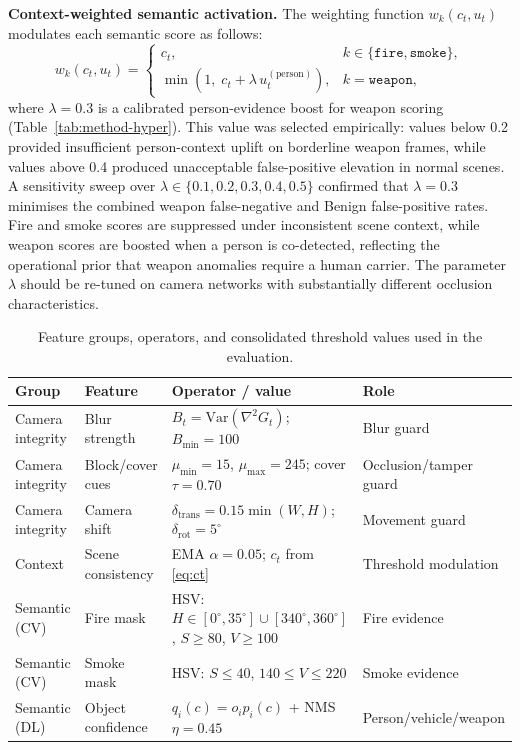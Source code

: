 \documentclass[sensors,article,submit,pdftex,moreauthors]{Definitions/mdpi}
\begin{document}
\textbf{Context-weighted semantic activation.} The weighting function $w_k(c_t, u_t)$ modulates each semantic score as follows:
\begin{equation}
\label{eq:wk}
w_k(c_t, u_t) =
\begin{cases}
c_t, & k \in \{\texttt{fire}, \texttt{smoke}\}, \\
\min(1,\; c_t + \lambda\, u_t^{(\text{person})}), & k = \texttt{weapon},
\end{cases}
\end{equation}
where $\lambda = 0.3$ is a calibrated person-evidence boost for weapon scoring (Table~\ref{tab:method-hyper}). This value was selected empirically: values below 0.2 provided insufficient person-context uplift on borderline weapon frames, while values above 0.4 produced unacceptable false-positive elevation in normal scenes. A sensitivity sweep over $\lambda \in \{0.1, 0.2, 0.3, 0.4, 0.5\}$ confirmed that $\lambda = 0.3$ minimises the combined weapon false-negative and Benign false-positive rates. Fire and smoke scores are suppressed under inconsistent scene context, while weapon scores are boosted when a person is co-detected, reflecting the operational prior that weapon anomalies require a human carrier. The parameter $\lambda$ should be re-tuned on camera networks with substantially different occlusion characteristics.
 
\begin{table}[H]
\caption{Feature groups, operators, and consolidated threshold values used in the evaluation.}
\label{tab:method-features}
\centering
\small
\setlength{\tabcolsep}{4pt}
\begin{tabular}{p{2.4cm} p{2.4cm} p{3.2cm} p{2.6cm}}
\toprule
\textbf{Group} & \textbf{Feature} & \textbf{Operator / value} & \textbf{Role} \\
\midrule
Camera integrity & Blur strength        & $B_t = \mathrm{Var}(\nabla^2 G_t)$; $B_{\min} = 100$ & Blur guard \\
Camera integrity & Block/cover cues     & $\mu_{\min}{=}15$, $\mu_{\max}{=}245$; cover $\tau{=}0.70$ & Occlusion/tamper guard \\
Camera integrity & Camera shift         & $\delta_{\text{trans}}{=}0.15\min(W,H)$; $\delta_{\text{rot}}{=}5^\circ$ & Movement guard \\
Context          & Scene consistency    & EMA $\alpha{=}0.05$; $c_t$ from \eqref{eq:ct} & Threshold modulation \\
Semantic (CV)    & Fire mask            & HSV: $H{\in}[0^\circ,35^\circ]\cup[340^\circ,360^\circ]$, $S{\ge}80$, $V{\ge}100$ & Fire evidence \\
Semantic (CV)    & Smoke mask           & HSV: $S{\le}40$, $140{\le}V{\le}220$ & Smoke evidence \\
Semantic (DL)    & Object confidence    & $q_i(c){=}o_i p_i(c)$ + NMS $\eta{=}0.45$ & Person/vehicle/weapon \\
\bottomrule
\end{tabular}
\end{table}
 
\end{document}
